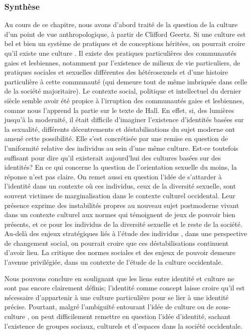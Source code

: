 \subsubsection{Synthèse}
\label{sec:synth_se} 
Au cours de ce chapitre, nous avons d'abord traité de la question de la culture d'un point de vue anthropologique, à partir de Clifford Geertz.
Si une culture est bel et bien un système de pratiques et de conceptions héritées, on pourrait croire qu'il existe une culture \lgbt{}. 
Il existe des pratiques particulières des communautés gaies et lesbiennes, notamment par l'existence de milieux de vie particuliers, de pratiques sociales et sexuelles différentes des hétérosexuels et d'une histoire particulière à cette communauté (qui demeure tout de même imbriquée dans celle de la société majoritaire).
Le contexte social, politique et intellectuel du dernier siècle semble avoir été propice à l'irruption des communautés gaies et lesbiennes, comme nous l'apprend la partie sur le texte de Hall. 
En effet, si, des lumières jusqu'à la modernité, il était difficile d'imaginer l'existence d'identités basées sur la sexualité, différents décentrements et déstabilisations du sujet moderne ont amené cette possibilité.
Elle s'est concrétisée par une remise en question de l'uniformité relative des individus au sein d'une même culture. 
Est-ce toutefois suffisant pour dire qu'il existerait aujourd'hui des cultures basées sur des identités? 
En ce qui concerne la question de l'orientation sexuelle du moins, la réponse n'est pas claire. 
On remet aussi en question l'idée de s'attarder à l'identité dans un contexte où ces individus, ceux de la diversité sexuelle, sont souvent victimes de marginalisation dans le contexte culturel occidental. 
Leur présence exprime des instabilités propres au nouveau sujet postmoderne vivant dans un contexte culturel aux normes qui témoignent de jeux de pouvoir bien présents, et ce pour les individus de la diversité sexuelle et le reste de la société. 
Au-delà des enjeux stratégiques liés à l'étude des individus \lgbt{}, dans une perspective de changement social, on pourrait croire que ces déstabilisations continuent d'avoir lieu. 
La critique des normes sociales et des enjeux de pouvoir demeure l'avenue privilégiée, dans un contexte de l'étude de la culture occidentale.

Nous pouvons conclure en soulignant que les liens entre identité et culture ne sont pas encore clairement définis; l'identité comme concept laisse croire qu'il est nécessaire d'appartenir à une culture particulière pour se lier à une identité précise. 
Pourtant, malgré l'ambiguïté entourant l'idée de culture ou de sous-culture \lgbt{}, on peut difficilement remettre en question l'idée d'identité, sachant l'existence de groupes sociaux, culturels et d'espaces \lgbt{} dans la société occidentale.

